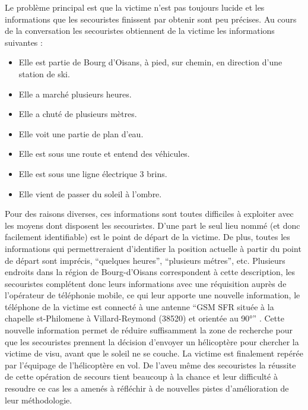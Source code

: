 Le problème principal est que la victime n'est pas toujours lucide et
les informations que les secouristes finissent par obtenir sont peu
précises. Au cours de la conversation les secouristes obtiennent de la
victime les informations suivantes :

\begin{itemize}
\item Elle est partie de Bourg d'Oisans, à pied, sur chemin, en
  direction d'une station de ski.
\item Elle a marché plusieurs heures.
 \item Elle a chuté de plusieurs mètres.
 \item Elle voit une partie de plan d'eau.
 \item Elle est sous une route et entend des véhicules.
 \item Elle est sous une ligne électrique 3 brins.
 \item Elle vient de passer du soleil à l'ombre.
\end{itemize}

Pour des raisons diverses, ces informations sont toutes difficiles à
exploiter avec les moyens dont disposent les secouristes. D'une part
le seul lieu nommé (et donc facilement identifiable) est le point de
départ de la victime. De plus, toutes les informations qui
permettreraient d'identifier la position actuelle à partir du point de
départ sont imprécis, \enquote{quelques heures}, \enquote{plusieurs
  métres}, etc. Plusieurs endroits dans la région de Bourg-d'Oisans
correspondent à cette description, les secouristes complétent donc
leurs informations avec une réquisition auprès de l'opérateur de
téléphonie mobile, ce qui leur apporte une nouvelle information, le
téléphone de la victime est connecté à une antenne \enquote{GSM SFR
  située à la chapelle st-Philomene à Villard-Reymond (38520) et
  orientée au 90°} \autocite{Lot 0.4}. Cette nouvelle information
permet de réduire suffisamment la zone de recherche pour que les
secouristes prennent la décision d'envoyer un hélicoptère pour
chercher la victime de visu, avant que le soleil ne se couche.
La victime est finalement repérée par l'équipage de l'hélicoptère en
vol. De l'aveu même des secouristes la réussite de cette opération de
secours tient beaucoup à la chance et leur difficulté à resoudre ce
cas les a amenés à réfléchir à de nouvelles pistes d'amélioration de
leur méthodologie.


